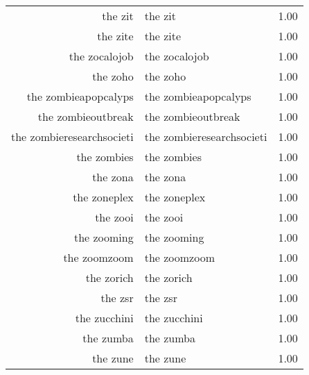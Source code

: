 \begin{table}[ht]
\begin{tabular}{rlr}
  the zit & the zit & 1.00 \\ 
  the zite & the zite & 1.00 \\ 
  the zocalojob & the zocalojob & 1.00 \\ 
  the zoho & the zoho & 1.00 \\ 
  the zombieapopcalyps & the zombieapopcalyps & 1.00 \\ 
  the zombieoutbreak & the zombieoutbreak & 1.00 \\ 
  the zombieresearchsocieti & the zombieresearchsocieti & 1.00 \\ 
  the zombies & the zombies & 1.00 \\ 
  the zona & the zona & 1.00 \\ 
  the zoneplex & the zoneplex & 1.00 \\ 
  the zooi & the zooi & 1.00 \\ 
  the zooming & the zooming & 1.00 \\ 
  the zoomzoom & the zoomzoom & 1.00 \\ 
  the zorich & the zorich & 1.00 \\ 
  the zsr & the zsr & 1.00 \\ 
  the zucchini & the zucchini & 1.00 \\ 
  the zumba & the zumba & 1.00 \\ 
  the zune & the zune & 1.00 \\ 
   \hline
\end{tabular}
\end{table}
